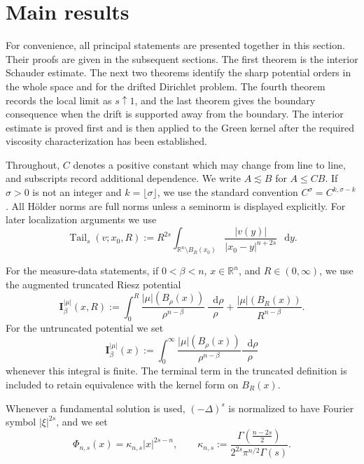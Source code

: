 \documentclass[reqno]{amsart}
\numberwithin{equation}{section}
\theoremstyle{plain}
\theoremstyle{definition}
\theoremstyle{remark}
\newcommand{\R}{\mathbb R}
\newcommand{\I}{\mathbf I}
\newcommand{\differential}{\mathop{}\!\mathrm d}
\newcommand{\Tail}{\operatorname{Tail}}
\newcommand{\rev}[1]{#1}
\begin{document}
\section{Main results}\label{sec:main-results}

For convenience, all principal statements are presented together in this
section.  Their proofs are given in the subsequent sections.  The first
theorem is the interior
Schauder estimate.  The next two theorems identify the sharp potential
orders in the whole space and for the drifted Dirichlet problem.  The fourth
theorem records the local limit as $s\uparrow1$, and the last theorem gives
the boundary consequence when the drift is supported away from the
boundary.  \rev{The interior estimate is proved first and is then applied to
the Green kernel after the required viscosity characterization has been
established.}

Throughout, $C$ denotes a positive constant which may change from line to
line, and subscripts record additional dependence.  We write $A\lesssim B$
for $A\le CB$.  If $\sigma>0$ is not an integer and
$k=\lfloor\sigma\rfloor$, we use the standard convention
$C^\sigma=C^{k,\sigma-k}$.  All H\"older norms are full norms unless a
seminorm is displayed explicitly.
For later localization arguments we use
\begin{equation}\label{eq:tail-definition}
 \Tail_s(v;x_0,R):=R^{2s}
 \int_{\R^n\setminus B_R(x_0)}
 \frac{|v(y)|}{|x_0-y|^{n+2s}}\,\differential y.
\end{equation}

For the measure-data statements, if $0<\beta<n$, $x\in\R^n$, and
$R\in(0,\infty)$, we use the augmented truncated Riesz potential
\begin{equation}\label{eq:riesz-potential-main}
 \I_\beta^{|\mu|}(x,R)
 :=\int_0^R
 \frac{|\mu|(B_\rho(x))}{\rho^{n-\beta}}\,\frac{\differential\rho}{\rho}
 +\frac{|\mu|(B_R(x))}{R^{n-\beta}}.
\end{equation}
For the untruncated potential we set
\[
 \I_\beta^{|\mu|}(x)
 :=\int_0^\infty
 \frac{|\mu|(B_\rho(x))}{\rho^{n-\beta}}
 \frac{\differential\rho}{\rho}
\]
whenever this integral is finite.  The terminal term in the truncated
definition is included to retain equivalence with the kernel
form on $B_R(x)$.

Whenever a fundamental solution is used, $(-\Delta)^s$ is normalized to
have Fourier symbol $|\xi|^{2s}$, and we set
\begin{equation}\label{eq:fundamental-normalized}
 \Phi_{n,s}(x)=\kappa_{n,s}|x|^{2s-n},\qquad
 \kappa_{n,s}:=
 \frac{\Gamma\!\left(\frac{n-2s}{2}\right)}
 {2^{2s}\pi^{n/2}\Gamma(s)}.
\end{equation}
\end{document}
